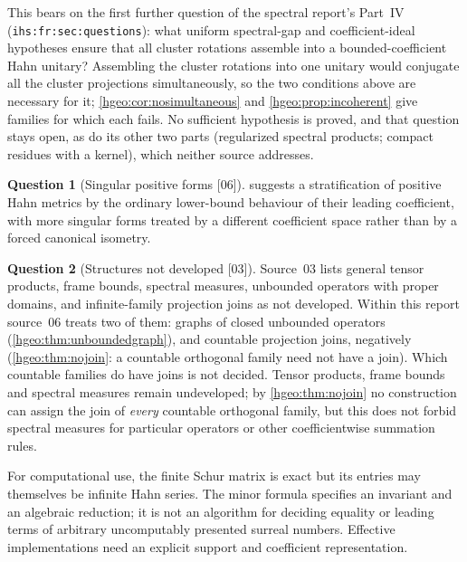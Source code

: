 \documentclass[11pt,letterpaper]{article}
\numberwithin{equation}{section}
\theoremstyle{definition}
\newtheorem{question}[question]{Question}
\theoremstyle{remark}
\newcommand{\src}[1]{\textup{\textsf{\small[#1]}}}
\newcommand{\replabel}[1]{\nolinkurl{#1}}
\begin{document}
This bears on the first further question of the spectral report's Part~IV
(\replabel{ihs:fr:sec:questions}): what uniform spectral-gap and
coefficient-ideal hypotheses ensure that all cluster rotations assemble into
a bounded-coefficient Hahn unitary? Assembling the cluster rotations into one
unitary would conjugate all the cluster projections simultaneously, so the
two conditions above are necessary for it; \cref{hgeo:cor:nosimultaneous}
and \cref{hgeo:prop:incoherent} give families for which each fails. No
sufficient hypothesis is proved, and that question stays open, as do its
other two parts (regularized spectral products; compact residues with a
kernel), which neither source addresses.

\begin{question}[Singular positive forms \src{06}]\label{hgeo:q:metric}
 suggests a stratification of positive Hahn metrics by
the ordinary lower-bound behaviour of their leading coefficient, with more
singular forms treated by a different coefficient space rather than by a
forced canonical isometry.
\end{question}

\begin{question}[Structures not developed \src{03}]\label{hgeo:q:notdeveloped}
Source~03 lists general tensor products, frame bounds, spectral measures,
unbounded operators with proper domains, and infinite-family projection
joins as not developed. Within this report source~06 treats two of them:
graphs of closed unbounded operators (\cref{hgeo:thm:unboundedgraph}), and
countable projection joins, negatively (\cref{hgeo:thm:nojoin}: a countable
orthogonal family need not have a join). Which countable families do have
joins is not decided. Tensor products, frame bounds and spectral measures
remain undeveloped; by \cref{hgeo:thm:nojoin} no construction can assign the
join of \emph{every} countable orthogonal family, but this does not forbid
spectral measures for particular operators or other coefficientwise
summation rules.
\end{question}

For computational use, the finite Schur matrix is exact but its entries may
themselves be infinite Hahn series. The minor formula specifies an invariant
and an algebraic reduction; it is not an algorithm for deciding equality or
leading terms of arbitrary uncomputably presented surreal numbers. Effective
implementations need an explicit support and coefficient representation.
\end{document}
